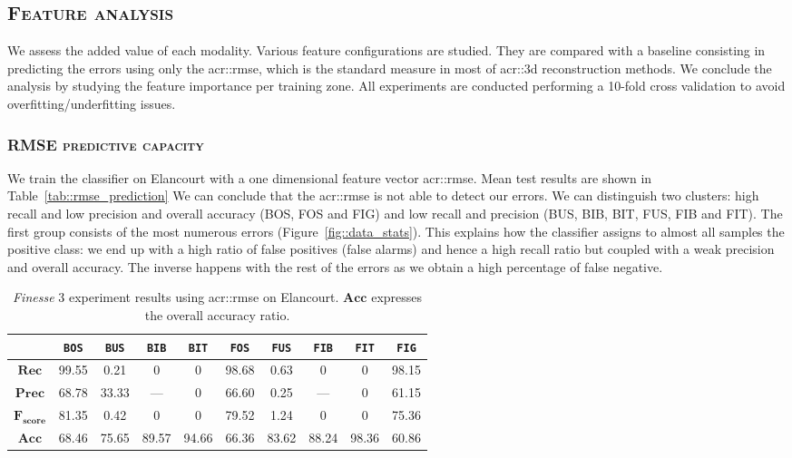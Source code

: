     \subsection{\textsc{Feature analysis}}
        We assess the added value of each modality. Various feature configurations are studied.
        They are compared with a baseline consisting in predicting the errors using only the \gls{acr::rmse}, which is the standard measure in most of \gls{acr::3d} reconstruction methods.
        We conclude the analysis by studying the feature importance per training zone.
        All experiments are conducted performing a 10-fold cross validation to avoid overfitting/underfitting issues.

        \subsubsection{\textsc{RMSE predictive capacity}}
            We train the classifier on Elancourt with a one dimensional feature vector \gls{acr::rmse}. Mean test results are shown in Table~\ref{tab::rmse_prediction} We can conclude that the \gls{acr::rmse} is not able to detect our  errors.  We can distinguish two clusters: high recall and low precision and overall accuracy (BOS, FOS and FIG) and low recall and precision (BUS, BIB, BIT, FUS, FIB and FIT). The first group consists of the most numerous errors (Figure~\ref{fig::data_stats}). This explains how the classifier assigns to almost all samples the positive class: we end up with a high ratio of false positives (false alarms) and hence a high recall ratio but coupled with a weak precision and overall accuracy. The inverse happens with the rest of the errors as we obtain a high percentage of false negative.
            \begin{table}[h]
                \begin{tabular}{c c c c c c c c c c}
                    \toprule
                    & \texttt{BOS} & \texttt{BUS} & \texttt{BIB} & \texttt{BIT} & \texttt{FOS} & \texttt{FUS} & \texttt{FIB} & \texttt{FIT} & \texttt{FIG} \\
                    \midrule
                    $\bm{Rec}$ & 99.55 & 0.21 & 0 & 0 & 98.68 & 0.63 & 0 & 0 & 98.15 \\
                    \midrule
                    $\bm{Prec}$ & 68.78 & 33.33 & --- & 0 & 66.60 & 0.25 & --- & 0 & 61.15 \\
                    \midrule
                    $\bm{F_{score}}$ & 81.35 & 0.42 & 0 & 0 & 79.52 & 1.24 & 0 & 0 & 75.36 \\
                    \midrule
                    $\bm{Acc}$ & 68.46 & 75.65 & 89.57 & 94.66 & 66.36 & 83.62 & 88.24 & 98.36 & 60.86 \\
                    \bottomrule
                \end{tabular}
                \caption{
                    \label{tab::rmse} \textit{Finesse} 3 experiment results using \gls{acr::rmse} on Elancourt.
                    $\bm{Acc}$ expresses the overall accuracy ratio.
                }
            \end{table}
